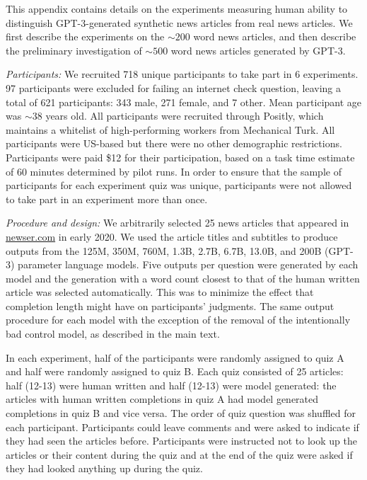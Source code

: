 This appendix contains details on the experiments measuring human ability to distinguish GPT-3-generated synthetic news articles from real news articles. We first describe the experiments on the $\sim200$ word news articles, and then describe the preliminary investigation of $\sim500$ word news articles generated by GPT-3.

\textit{Participants:} We recruited 718 unique participants to take part in 6 experiments. 97 participants were excluded  for failing an internet check question, leaving a total of 621 participants: 343 male, 271 female, and 7 other. Mean participant age was $\sim38$ years old. All participants were recruited through Positly, which maintains a whitelist of high-performing workers from Mechanical Turk. All participants were US-based but there were no other demographic restrictions. Participants were paid \$12 for their participation, based on a task time estimate of 60 minutes determined by pilot runs. In order to ensure that the sample of participants for each experiment quiz was unique, participants were not allowed to take part in an experiment more than once.

\textit{Procedure and design:} We arbitrarily selected 25 news articles that appeared in \href{newser.com}{newser.com} in early 2020. We used the article titles and subtitles to produce outputs from the 125M, 350M, 760M, 1.3B, 2.7B, 6.7B, 13.0B, and 200B (GPT-3) parameter language models. Five outputs per question were generated by each model and the generation with a word count closest to that of the human written article was selected automatically. This was to minimize the effect that completion length might have on participants’ judgments.  The same output procedure for each model with the exception of the removal of the intentionally bad control model, as described in the main text. 

In each experiment, half of the participants were randomly assigned to quiz A and half were randomly assigned to quiz B. Each quiz consisted of 25 articles: half (12-13) were human written and half (12-13) were model generated: the articles with human written completions in quiz A had model generated completions in quiz B and vice versa. The order of quiz question was shuffled for each participant. Participants could leave comments and were asked to indicate if they had seen the articles before. Participants were instructed not to look up the articles or their content during the quiz and at the end of the quiz were asked if they had looked anything up during the quiz.

